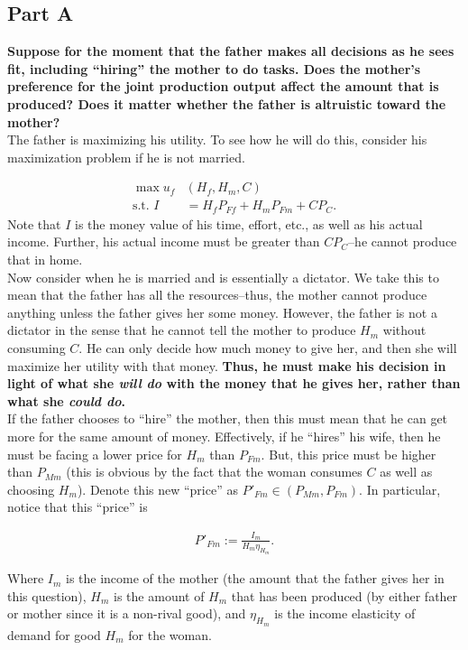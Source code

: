 \documentclass[12pt]{paper}
\begin{document}
\subsection*{Part A} 
\textbf{Suppose for the moment that the father makes all decisions as he sees fit, including “hiring” the mother to do tasks. Does the mother’s preference for the joint production output affect the amount that is produced? Does it matter whether the father is altruistic toward the mother?}
\\

The father is maximizing his utility. To see how he will do this,
consider his maximization problem if he is not married.

\begin{align*}
    \max u_f&(H_f,H_m,C)\\
    \text{s.t. } I&=H_fP_{Ff}+H_mP_{Fm}+CP_C.
\end{align*}
Note that $I$ is the money value of his time, effort, etc., as well as
his actual income. Further, his actual income must be greater than
$CP_C$--he cannot produce that in home.
\\

Now consider when he is married and is essentially a dictator. We take
this to mean that the father has all the resources--thus, the mother
cannot produce anything unless the father gives her some
money. However, the father is not a dictator in the sense that he
cannot tell the mother to produce $H_m$ without consuming $C$. He can
only decide how much money to give her, and then she will maximize her
utility with that money. \textbf{Thus, he must make his decision in
  light of what she \textit{will do} with the money that he gives her,
  rather than what she \textit{could do}.}
\\

If the father chooses to ``hire'' the mother, then this must mean that
he can get more for the same amount of money. Effectively, if he
``hires'' his wife, then he must be facing a lower price for $H_m$
than $P_{Fm}$. But, this price must be higher than $P_{Mm}$ (this is
obvious by the fact that the woman consumes $C$ as well as choosing
$H_m$). Denote this new ``price'' as $P'_{Fm}\in(P_{Mm},P_{Fm})$. In
particular, notice that this ``price'' is

\begin{align*}
    P'_{Fm}:=\frac{I_m}{H_m \eta_{H_m}}.
\end{align*}

Where $I_m$ is the income of the mother (the amount that the father
gives her in this question), $H_m$ is the amount of $H_m$ that has
been produced (by either father or mother since it is a non-rival
good), and $\eta_{H_m}$ is the income elasticity of demand for good
$H_m$ for the woman.
\\
\end{document}

